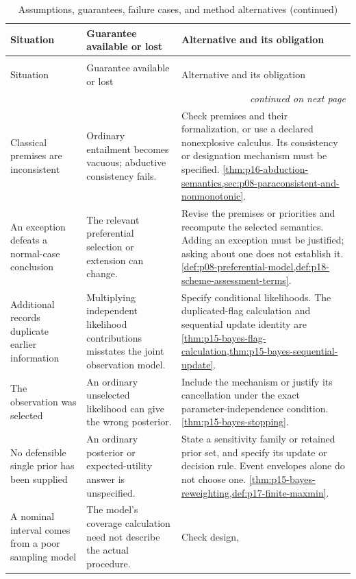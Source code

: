 \begin{longtable}{@{}p{}p{}p{}@{}}
\caption{Assumptions, guarantees, failure cases, and method alternatives}\\
\toprule
Situation & Guarantee available or lost & Alternative and its obligation \\
\midrule
\endfirsthead
\caption[]{Assumptions, guarantees, failure cases, and method alternatives (continued)}\\
\toprule
Situation & Guarantee available or lost & Alternative and its obligation \\
\midrule
\endhead
\midrule\multicolumn{3}{r}{\emph{continued on next page}}\\
\endfoot
\endlastfoot
Classical premises are inconsistent & Ordinary entailment becomes vacuous;
abductive consistency fails. & Check premises and their formalization, or
use a declared nonexplosive calculus. Its consistency or designation
mechanism must be specified.
\cref{thm:p16-abduction-semantics,sec:p08-paraconsistent-and-nonmonotonic}. \\
An exception defeats a normal-case conclusion & The relevant preferential
selection or extension can change. & Revise the premises or priorities and
recompute the selected semantics. Adding an exception must be justified;
asking about one does not establish it.
\cref{def:p08-preferential-model,def:p18-scheme-assessment-terms}. \\
Additional records duplicate earlier information & Multiplying independent
likelihood contributions misstates the joint observation model. & Specify
conditional likelihoods. The duplicated-flag calculation and sequential
update identity are
\cref{thm:p15-bayes-flag-calculation,thm:p15-bayes-sequential-update}. \\
The observation was selected & An ordinary unselected likelihood can give
the wrong posterior. & Include the mechanism or justify its cancellation
under the exact parameter-independence condition.
\cref{thm:p15-bayes-stopping}. \\
No defensible single prior has been supplied & An ordinary posterior or
expected-utility answer is unspecified. & State a sensitivity family or
retained prior set, and specify its update or decision rule. Event envelopes
alone do not choose one.
\cref{thm:p15-bayes-reweighting,def:p17-finite-maxmin}. \\
A nominal interval comes from a poor sampling model & The model's coverage
calculation need not describe the actual procedure. & Check design,

\end{longtable}
